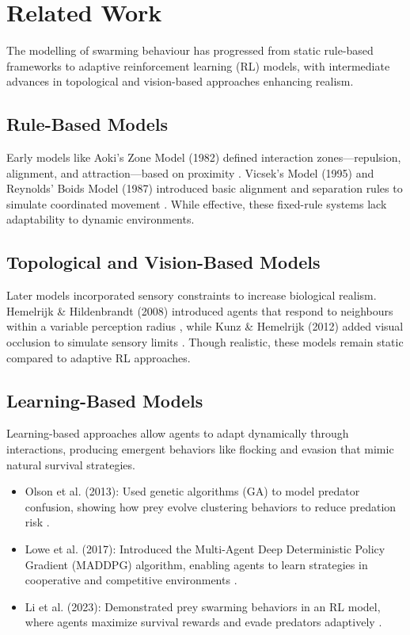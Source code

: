 \documentclass[9pt]{pnas-new}
\begin{document}
\section*{Related Work}
The modelling of swarming behaviour has progressed from static rule-based frameworks to adaptive reinforcement learning (RL) models, with intermediate advances in topological and vision-based approaches enhancing realism.

\subsection{Rule-Based Models}
Early models like Aoki's Zone Model (1982) defined interaction zones—repulsion, alignment, and attraction—based on proximity \cite{aoki1987zones}. Vicsek's Model (1995) and Reynolds' Boids Model (1987) introduced basic alignment and separation rules to simulate coordinated movement \cite{Vicsek1995}\cite{reynolds1987boids}. While effective, these fixed-rule systems lack adaptability to dynamic environments.

\subsection{Topological and Vision-Based Models}
Later models incorporated sensory constraints to increase biological realism. Hemelrijk \& Hildenbrandt (2008) introduced agents that respond to neighbours within a variable perception radius \cite{Hemelrijk2008}, while Kunz \& Hemelrijk (2012) added visual occlusion to simulate sensory limits \cite{kunz2012}. Though realistic, these models remain static compared to adaptive RL approaches.

\subsection{Learning-Based Models}

Learning-based approaches allow agents to adapt dynamically through interactions, producing emergent behaviors like flocking and evasion that mimic natural survival strategies.

\begin{itemize}
    \item Olson et al. (2013): Used genetic algorithms (GA) to model predator confusion, showing how prey evolve clustering behaviors to reduce predation risk \cite{olson2013predator}.
    \item Lowe et al. (2017): Introduced the Multi-Agent Deep Deterministic Policy Gradient (MADDPG) algorithm, enabling agents to learn strategies in cooperative and competitive environments \cite{lowe2017}.
    \item Li et al. (2023): Demonstrated prey swarming behaviors in an RL model, where agents maximize survival rewards and evade predators adaptively \cite{li2023predator}.
\end{itemize}
\end{document}
